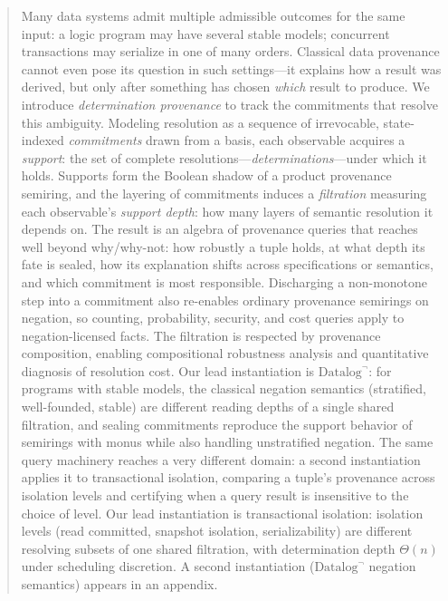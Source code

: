 \begin{abstract}
  Many data systems admit multiple admissible outcomes for the same
  input: a logic program may have several stable models; concurrent
  transactions may serialize in one of many orders.
  Classical data provenance cannot even pose its question in such
  settings---it explains how a result was derived, but only after
  something has chosen \emph{which} result to produce.
  We introduce \emph{determination provenance} to track the
  commitments that resolve this ambiguity.
  Modeling resolution as a sequence of irrevocable, state-indexed
  \emph{commitments} drawn from a basis, each observable acquires a
  \emph{support}: the set of complete resolutions---\emph{determinations}---under
  which it holds.
  Supports form the Boolean shadow of a product provenance semiring, and
  the layering of commitments induces a \emph{filtration} measuring each
  observable's \emph{support depth}: how many layers of semantic
  resolution it depends on.
  The result is an algebra of provenance queries that reaches well beyond
  why/why-not: how robustly a tuple holds, at what depth its fate is sealed,
  how its explanation shifts across specifications or semantics, and which
  commitment is most responsible. Discharging a non-monotone step into a
  commitment also re-enables ordinary provenance semirings on negation, so
  counting, probability, security, and cost queries apply to negation-licensed
  facts.
  The filtration is respected by provenance composition, enabling
  compositional robustness analysis and quantitative diagnosis of
  resolution cost.
  \ifleaddatalog
  Our lead instantiation is $\mbox{Datalog}^\neg$: for programs with
  stable models, the classical negation semantics (stratified,
  well-founded, stable) are different reading depths of a single shared
  filtration, and sealing commitments reproduce the support behavior of
  semirings with monus while also handling unstratified negation.
  The same query machinery reaches a very different domain: a second
  instantiation applies it to transactional isolation, comparing a tuple's
  provenance across isolation levels and certifying when a query result is
  insensitive to the choice of level.
  \else
  Our lead instantiation is transactional isolation: isolation levels
  (read committed, snapshot isolation, serializability) are different
  resolving subsets of one shared filtration, with determination depth
  $\Theta(n)$ under scheduling discretion.
  A second instantiation ($\mbox{Datalog}^\neg$ negation semantics)
  appears in an appendix.
  \fi
\end{abstract}
